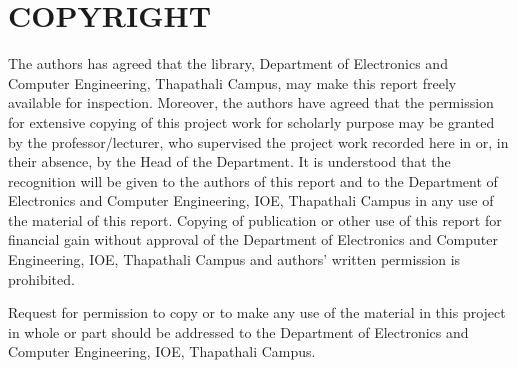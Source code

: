 \chapter*{COPYRIGHT}
{}

The authors has agreed that the library, Department of Electronics and Computer Engineering, Thapathali Campus, may make this report freely available for inspection. Moreover, the authors have agreed that the permission for extensive copying of this project work for scholarly purpose may be granted by the professor/lecturer, who supervised the project work recorded here in or, in their absence, by the Head of the Department. It is understood that the recognition will be given to the authors of this report and to the Department of Electronics and Computer Engineering, IOE, Thapathali Campus in any use of the material of this report. Copying of publication or other use of this report for financial gain without approval of the Department of Electronics and Computer Engineering, IOE, Thapathali Campus and authors' written permission is prohibited. 

Request for permission to copy or to make any use of the material in this project in whole or part should be addressed to the Department of Electronics and Computer
Engineering, IOE, Thapathali Campus.
